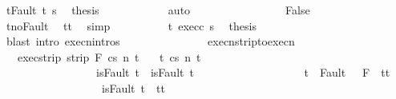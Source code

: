 \begin{isabellebody}
\ t{\isacharprime}{\isacharunderscore}Fault\ t{\isacharprime}\ s\ \isamarkupfalse%
\ {\isacharquery}thesis\isanewline
\ \ \ \ \ \ \ \ \ \ \isamarkupfalse%
\ auto\isanewline
\ \ \ \ \ \ \isamarkupfalse%
\isanewline
\ \ \ \ \ \ \ \ \isamarkupfalse%
\ False\isanewline
\ \ \ \ \ \ \ \ \isamarkupfalse%
\ t{\isacharprime}{\isacharunderscore}noFault\ \isamarkupfalse%
\ {\isachardoublequoteopen}t{\isacharprime}{\isacharequal}t{\isachardoublequoteclose}\ \isamarkupfalse%
\ simp\isanewline
\ \ \ \ \ \ \ \ \isamarkupfalse%
\ t\ exec{\isacharunderscore}c{}\ s\ \isamarkupfalse%
\ {\isacharquery}thesis\isanewline
\ \ \ \ \ \ \ \ \ \ \isamarkupfalse%
\ {\isacharparenleft}blast\ intro{\isacharcolon}\ execn{\isachardot}intros{\isacharparenright}\isanewline
\ \ \ \ \ \ \isamarkupfalse%
\isanewline
\ \ \ \ \isamarkupfalse%
\isanewline
\ \ \isamarkupfalse%
\isanewline
{}\isamarkupfalse%
%
\endisatagproof
{\isafoldproof}%
%
\isadelimproof
\isanewline
%
\endisadelimproof
\isanewline
\isanewline
{}\isamarkupfalse%
\ execn{\isacharunderscore}strip{\isacharunderscore}to{\isacharunderscore}execn{\isacharcolon}\isanewline
\ \ \ exec{\isacharunderscore}strip{\isacharcolon}\ {\isachardoublequoteopen}strip\ F\ {\isasymGamma}{\isasymturnstile}{\isasymlangle}c{\isacharcomma}s{\isasymrangle}\ {\isacharequal}n{\isasymRightarrow}\ t{\isachardoublequoteclose}\isanewline
\ \ \ {\isachardoublequoteopen}{\isasymexists}t{\isacharprime}{\isachardot}\ {\isasymGamma}{\isasymturnstile}{\isasymlangle}c{\isacharcomma}s{\isasymrangle}\ {\isacharequal}n{\isasymRightarrow}\ t{\isacharprime}\ {\isasymand}\ \isanewline
\ \ \ \ \ \ \ \ \ \ \ \ \ \ \ \ \ {\isacharparenleft}isFault\ t\ {\isasymlongrightarrow}\ isFault\ t{\isacharprime}{\isacharparenright}\ {\isasymand}\ \isanewline
\ \ \ \ \ \ \ \ \ \ \ \ \ \ \ \ \ {\isacharparenleft}t{\isacharprime}\ {\isasymin}\ Fault\ {\isacharbackquote}\ {\isacharparenleft}{\isacharminus}\ F{\isacharparenright}\ {\isasymlongrightarrow}\ t{\isacharprime}{\isacharequal}t{\isacharparenright}\ {\isasymand}\isanewline
\ \ \ \ \ \ \ \ \ \ \ \ \ \ \ \ \ {\isacharparenleft}{\isasymnot}\ isFault\ t{\isacharprime}\ {\isasymlongrightarrow}\ t{\isacharprime}{\isacharequal}t{\isacharparenright}{\isachardoublequoteclose}\isanewline
%
\isadelimproof
%
\endisadelimproof
%
\isatagproof
{}\isamarkupfalse%

\end{isabellebody}
